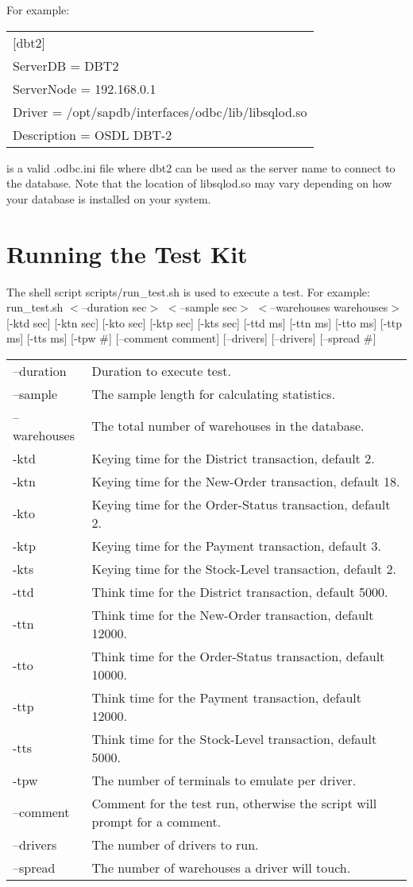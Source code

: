 \documentclass{article}
\begin{document}
For example: \\
\begin{tabular}[c]{l}
[dbt2] \\
ServerDB = DBT2 \\
ServerNode = 192.168.0.1 \\
Driver = /opt/sapdb/interfaces/odbc/lib/libsqlod.so \\
Description = OSDL DBT-2 \\
\end{tabular}

is a valid .odbc.ini file where dbt2 can be used as the server name to
connect to the database.  Note that the location of libsqlod.so may vary
depending on how your database is installed on your system.

\section{Running the Test Kit}

The shell script scripts/run\_test.sh is used to execute a test.  For example:
	run\_test.sh $<$--duration sec$>$ $<$--sample sec$>$ $<$--warehouses warehouses$>$
		[-ktd sec] [-ktn sec] [-kto sec] [-ktp sec] [-kts sec] [-ttd ms]
		[-ttn ms] [-tto ms] [-ttp ms] [-tts ms] [-tpw \#] 
		[--comment comment] [--drivers] [--drivers] [--spread \#] \\
\begin{tabular}[c]{ll}
--duration & Duration to execute test. \\
--sample &The sample length for calculating statistics. \\
--warehouses & The total number of warehouses in the database. \\
-ktd & Keying time for the District transaction, default 2. \\
-ktn & Keying time for the New-Order transaction, default 18. \\
-kto & Keying time for the Order-Status transaction, default 2. \\
-ktp & Keying time for the Payment transaction, default 3. \\
-kts & Keying time for the Stock-Level transaction, default 2. \\
-ttd & Think time for the District transaction, default 5000. \\
-ttn & Think time for the New-Order transaction, default 12000. \\
-tto & Think time for the Order-Status transaction, default 10000. \\
-ttp & Think time for the Payment transaction, default 12000. \\
-tts & Think time for the Stock-Level transaction, default 5000. \\
-tpw & The number of terminals to emulate per driver. \\
--comment & Comment for the test run, otherwise the script will prompt for a comment. \\
--drivers & The number of drivers to run. \\
--spread & The number of warehouses a driver will touch. \\
\end{tabular}
\end{document}
